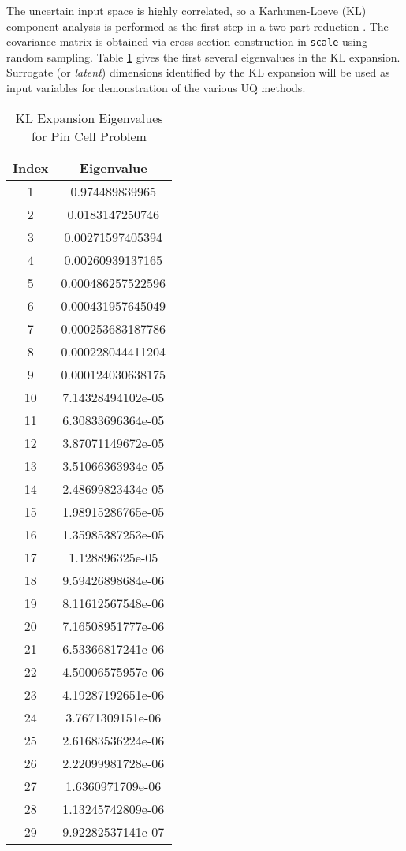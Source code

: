 The uncertain input space is highly correlated, so a Karhunen-Loeve (KL) component analysis is performed as
the first step in a two-part reduction \cite{physor2016}. The
covariance matrix is obtained via cross section construction in \texttt{scale}\cite{scale} using random sampling.  
Table \ref{tab:pcarank} gives the first several eigenvalues in the KL expansion.  Surrogate (or
\emph{latent}) dimensions identified by the KL expansion will be used as input variables for demonstration of
the various UQ methods.

\begin{table}[H]
  \centering
  \begin{tabular}{c|c}
Index & Eigenvalue \\ \hline
1 & 0.974489839965 \\
2 & 0.0183147250746 \\
3 & 0.00271597405394 \\
4 & 0.00260939137165 \\
5 & 0.000486257522596 \\
6 & 0.000431957645049 \\
7 & 0.000253683187786 \\
8 & 0.000228044411204 \\
9 & 0.000124030638175 \\
10 & 7.14328494102e-05 \\
11 & 6.30833696364e-05 \\
12 & 3.87071149672e-05 \\
13 & 3.51066363934e-05 \\
14 & 2.48699823434e-05 \\
15 & 1.98915286765e-05 \\
16 & 1.35985387253e-05 \\
17 & 1.128896325e-05 \\
18 & 9.59426898684e-06 \\
19 & 8.11612567548e-06 \\
20 & 7.16508951777e-06 \\
21 & 6.53366817241e-06 \\
22 & 4.50006575957e-06 \\
23 & 4.19287192651e-06 \\
24 & 3.7671309151e-06 \\
25 & 2.61683536224e-06 \\
26 & 2.22099981728e-06 \\
27 & 1.6360971709e-06 \\
28 & 1.13245742809e-06 \\
29 & 9.92282537141e-07
\end{tabular}
\caption{KL Expansion Eigenvalues for Pin Cell Problem}
\label{tab:pcarank}
\end{table}
